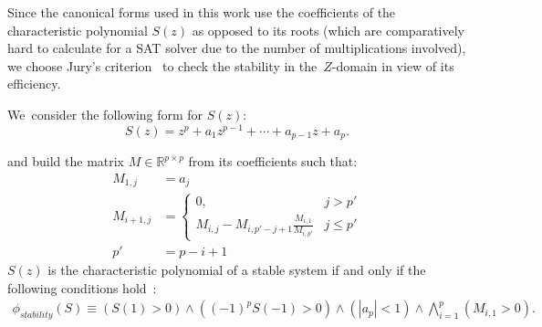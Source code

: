\documentclass[a4paper,UKenglish]{lipics-v2018}
\newcommand{\mat}[1]{{#1}}
\begin{document}
Since the canonical forms used in this work use the coefficients of the
characteristic polynomial $S(z)$ as opposed to its roots (which are
comparatively hard to calculate for a SAT solver due to the number of
multiplications involved), we choose Jury's criterion~\cite{astrom1997computer}
to check the stability in the~$Z$-domain in view of its efficiency.

We~consider the following form for $S(z)$:
%
\begin{equation*}
S(z) = z^{p}+a_1z^{p-1}+\cdots+a_{p-1}z+a_p.
\end{equation*}

and build the matrix
$\mat{M} \in \mathbb{R}^{p \times p}$ from its coefficients such that:
%
\begin{align*}
\mat{M}_{1,j}&=a_j\\
\mat{M}_{i+1,j}&=\left\{
\begin{array}{ll}
0,&j>p'\\
\mat{M}_{i,j}-\mat{M}_{i,p'-j+1}\frac{\mat{M}_{i,1}}{\mat{M}_{i,p'}} &j\leq p'
\end{array}
\right.\\
p'&=p-i+1
\end{align*}
%
$S(z)$ is the characteristic polynomial of a stable system if and
only if the following conditions hold~\cite{astrom1997computer}:
\begin{align*}
\phi_\mathit{stability}(S) \equiv
(S(1) > 0) \wedge ((-1)^p S(-1) > 0) \wedge (|a_p| < 1) \wedge \bigwedge\limits_{i=1}^p (\mat{M}_{i,1} > 0).
\end{align*}
\end{document}
